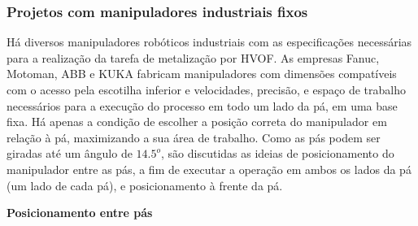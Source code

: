 \subsubsection{Projetos com manipuladores industriais fixos}\label{proj_manip}
Há diversos manipuladores robóticos industriais com as especificações
necessárias para a realização da tarefa de metalização por HVOF. As empresas
Fanuc, Motoman, ABB e KUKA fabricam manipuladores com dimensões compatíveis com o
acesso pela escotilha inferior e velocidades, precisão, e espaço de trabalho
necessários para a execução do processo em todo um lado da pá, em uma base fixa.
Há apenas a condição de escolher a posição correta do manipulador em relação à pá,
maximizando a sua área de trabalho. Como as pás podem ser giradas até um ângulo
de $14.5^o$, são discutidas as ideias de posicionamento do manipulador entre as
pás, a fim de executar a operação em ambos os lados da pá (um lado de cada pá),
e posicionamento à frente da pá.

\textbf{Posicionamento entre pás}


